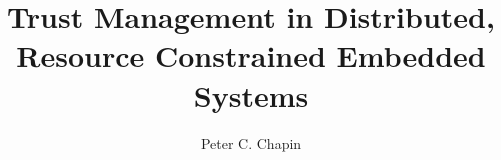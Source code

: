 \documentclass[11pt]{report}
\newcommand{\primaryspacing}{\doublespace}
\begin{document}
\title{Trust Management in Distributed,\\Resource Constrained Embedded Systems}
\author{Peter C. Chapin}
\maketitle

\makeacceptance
{}






\singlespace

\tableofcontents
\clearpage

\listoftables
\clearpage

\listoffigures
\clearpage

%

\primaryspacing










\appendix

%






\primaryspacing

%
\end{document}
